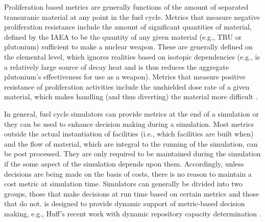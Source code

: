 Proliferation based metrics are generally functions of the amount of separated
transuranic material at any point in the fuel cycle. Metrics that measure
negative proliferation resistance include the amount of significant quantities
of material, defined by the IAEA to be the quantity of any given material (e.g.,
TRU or plutonium) sufficient to make a nuclear weapon. These are generally
defined on the elemental level, which ignores realities based on isotopic
dependencies (e.g.,  is a relatively large source of decay heat
and is thus reduces the aggregate plutonium's effectiveness for use as a
weapon). Metrics that measure positive resistance of proliferation activities
include the unshielded dose rate of a given material, which makes handling (and
thus diverting) the material more difficult \cite{yacout_vision_2006}.

In general, fuel cycle simulators can provide metrics at the end of a simulation
or they can be used to enhance decision making during a simulation. Most metrics
outside the actual instantiation of facilities (i.e., which facilities are built
when) and the flow of material, which are integral to the running of the
simulation, can be post processed. They are only required to be maintained
during the simulation if the some aspect of the simulation depends upon
them. Accordingly, unless decisions are being made on the basis of costs, there
is no reason to maintain a cost metric at simulation time. Simulators can
generally be divided into two groups, those that make decisions at run time
based on certain metrics and those that do not. \Cyclus is designed to provide
dynamic support of metric-based decision making, e.g., Huff's recent work with
dynamic repository capacity determination
\cite{huff_integrated_2013}.
